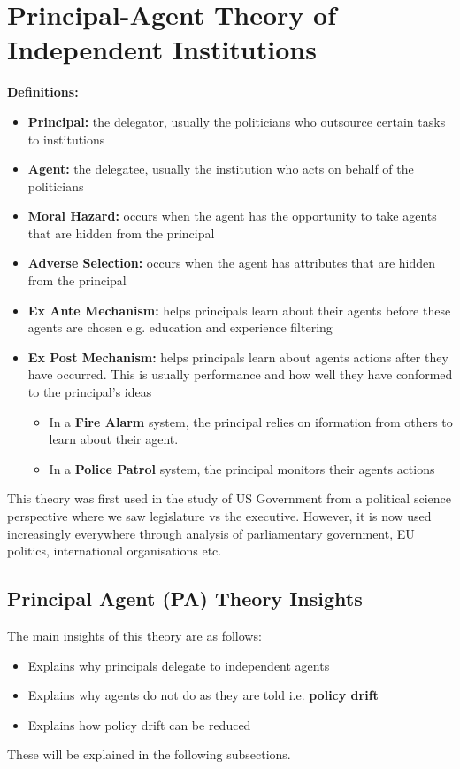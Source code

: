 \documentclass[12pt, letterpaper]{article}
\begin{document}
\section{Principal-Agent Theory of Independent Institutions}
\textbf{Definitions:}
\begin{itemize}
	\item \textbf{Principal:} the delegator, usually the politicians who outsource certain tasks to institutions
	\item \textbf{Agent:} the delegatee, usually the institution who acts on behalf of the politicians
	\item \textbf{Moral Hazard:} occurs when the agent has the opportunity to take agents that are hidden from the principal
	\item \textbf{Adverse Selection:} occurs when the agent has attributes that are hidden from the principal
	\item \textbf{Ex Ante Mechanism:} helps principals learn about their agents before these agents are chosen e.g. education and experience filtering
	\item \textbf{Ex Post Mechanism:} helps principals learn about agents actions after they have occurred. This is usually performance and how well they have conformed to the principal's ideas
	\begin{itemize}
		\item In a \textbf{Fire Alarm} system, the principal relies on iformation from others to learn about their agent.
		\item In a \textbf{Police Patrol} system, the principal monitors their agents actions
	\end{itemize}	 
\end{itemize}
This theory was first used in the study of US Government from a political science perspective where we saw legislature vs the executive. However, it is now used increasingly everywhere through analysis of parliamentary government, EU politics, international organisations etc.

\subsection{Principal Agent (PA) Theory Insights}
The main insights of this theory are as follows:
\begin{itemize}
	\item Explains why principals delegate to independent agents
	\item Explains why agents do not do as they are told i.e. \textbf{policy drift}
	\item Explains how policy drift can be reduced
\end{itemize}
These will be explained in the following subsections.
\end{document}
